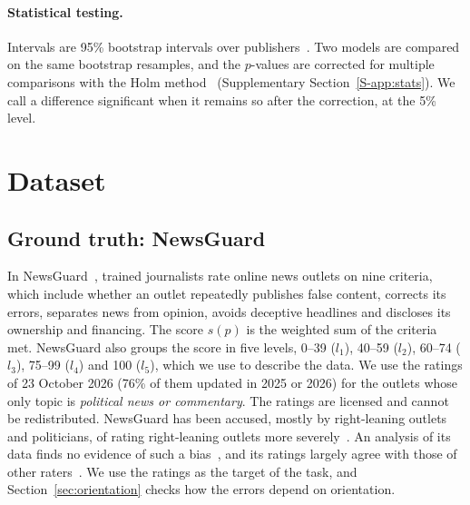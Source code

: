 \documentclass[11pt,a4paper]{article}
\begin{document}
\paragraph{Statistical testing.} Intervals are 95\% bootstrap intervals over publishers~\cite{efron1979bootstrap}. Two
models are compared on the same bootstrap resamples, and the $p$-values are corrected for multiple comparisons with the
Holm method~\cite{holm1979simple} (Supplementary Section~\ref{S-app:stats}). We call a difference significant when it
remains so after the correction, at the 5\% level.

\section{Dataset}\label{sec:data}

\subsection{Ground truth: NewsGuard}\label{sec:labels}
In NewsGuard~\cite{newsguard}, trained journalists rate online news outlets on nine criteria, which include whether an
outlet repeatedly publishes false content, corrects its errors, separates news from opinion, avoids deceptive headlines
and discloses its ownership and financing. The score $s(p)$ is the weighted sum of the criteria met. NewsGuard also
groups the score in five levels, 0--39 ($l_1$), 40--59 ($l_2$), 60--74 ($l_3$), 75--99 ($l_4$) and 100 ($l_5$), which we
use to describe the data. We use the ratings of 23 October 2026 (76\% of them updated in 2025 or 2026) for the outlets
whose only topic is \emph{political news or commentary}. The ratings are licensed and cannot be redistributed. NewsGuard
has been accused, mostly by right-leaning outlets and politicians, of rating right-leaning outlets more
severely~\cite{oremus2024newsguard}. An analysis of its data finds no evidence of such a bias~\cite{luhring2025best},
and its ratings largely agree with those of other raters~\cite{lin2023high}. We use the ratings as the target of the
task, and Section~\ref{sec:orientation} checks how the errors depend on orientation.
\end{document}
